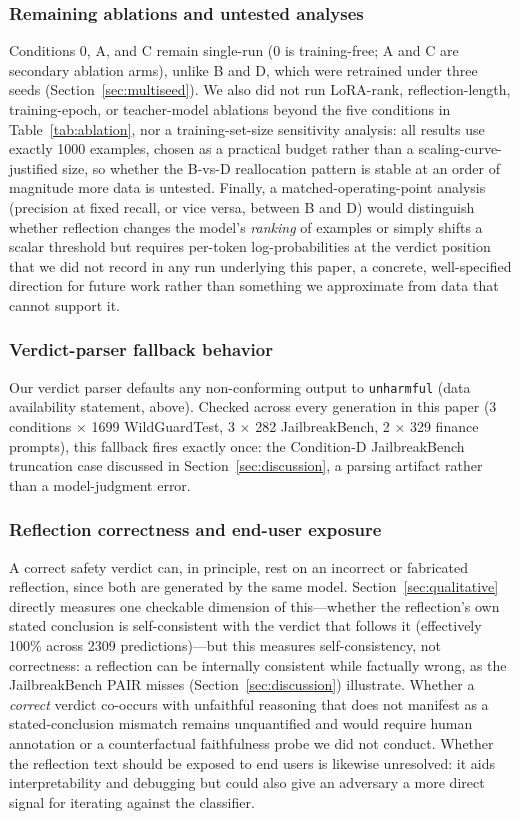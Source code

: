 \documentclass[superintelligence,article,accept,moreauthors]{Definitions/mdpi}
\begin{document}
\subsubsection{Remaining ablations and untested analyses}
Conditions 0, A, and C remain single-run (0 is training-free; A and C are secondary ablation arms), unlike B and D, which were retrained under three seeds (Section~\ref{sec:multiseed}). We also did not run LoRA-rank, reflection-length, training-epoch, or teacher-model ablations beyond the five conditions in Table~\ref{tab:ablation}, nor a training-set-size sensitivity analysis: all results use exactly 1000 examples, chosen as a practical budget rather than a scaling-curve-justified size, so whether the B-vs-D reallocation pattern is stable at an order of magnitude more data is untested. Finally, a matched-operating-point analysis (precision at fixed recall, or vice versa, between B and D) would distinguish whether reflection changes the model's \emph{ranking} of examples or simply shifts a scalar threshold but requires per-token log-probabilities at the verdict position that we did not record in any run underlying this paper, a concrete, well-specified direction for future work rather than something we approximate from data that cannot support it.

\subsubsection{Verdict-parser fallback behavior}
Our verdict parser defaults any non-conforming output to \texttt{unharmful} (data availability statement, above). Checked across every generation in this paper (3 conditions $\times$ 1699 WildGuardTest, 3 $\times$ 282 JailbreakBench, 2 $\times$ 329 finance prompts), this fallback fires exactly once: the Condition-D JailbreakBench truncation case discussed in Section~\ref{sec:discussion}, a parsing artifact rather than a model-judgment error.

\subsubsection{Reflection correctness and end-user exposure}
A correct safety verdict can, in principle, rest on an incorrect or fabricated reflection, since both are generated by the same model. Section~\ref{sec:qualitative} directly measures one checkable dimension of this---whether the reflection's own stated conclusion is self-consistent with the verdict that follows it (effectively 100\% across 2309 predictions)---but this measures self-consistency, not correctness: a reflection can be internally consistent while factually wrong, as the JailbreakBench PAIR misses (Section~\ref{sec:discussion}) illustrate. Whether a \emph{correct} verdict co-occurs with unfaithful reasoning that does not manifest as a stated-conclusion mismatch remains unquantified and would require human annotation or a counterfactual faithfulness probe we did not conduct. Whether the reflection text should be exposed to end users is likewise unresolved: it aids interpretability and debugging but could also give an adversary a more direct signal for iterating against the classifier.
\end{document}
